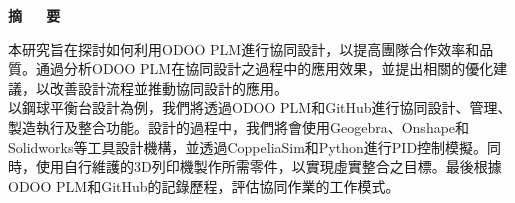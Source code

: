 \renewcommand{\baselinestretch}{1.5} %
\clearpage  %
\sectionef
{} %
\begin{center}
\LARGE\textbf{摘~~~要}\\
\end{center}

\raggedright
\fontsize{14pt}{20pt}\sectionef\hspace{12pt}\quad 本研究旨在探討如何利用ODOO PLM進行協同設計，以提高團隊合作效率和品質。通過分析ODOO PLM在協同設計之過程中的應用效果，並提出相關的優化建議，以改善設計流程並推動協同設計的應用。\\[14pt]

\fontsize{14pt}{20pt}\sectionef\hspace{12pt}\quad 以鋼球平衡台設計為例，我們將透過ODOO PLM和GitHub進行協同設計、管理、製造執行及整合功能。設計的過程中，我們將會使用Geogebra、Onshape和Solidworks等工具設計機構，並透過CoppeliaSim和Python進行PID控制模擬。同時，使用自行維護的3D列印機製作所需零件，以實現虛實整合之目標。最後根據ODOO PLM和GitHub的記錄歷程，評估協同作業的工作模式。\\




\vspace{11cm}


